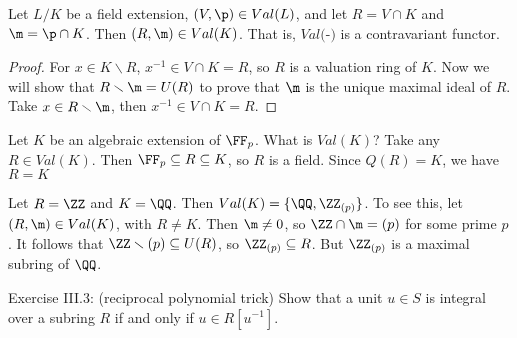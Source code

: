  \begin{proposition}
   Let $L/K$ be a field extension, $(V,\p)\in Val(L)$, and let $R=V\cap K$ and
   $\m=\p\cap K$. Then $(R,\m)\in Val(K)$. That is, $Val($-$)$ is a contravariant functor.
 \end{proposition}
 \begin{proof}
   For $x\in K\smallsetminus R$, $x^{-1}\in V\cap K=R$, so $R$ is a valuation ring of
   $K$. Now we will show that $R\smallsetminus \m = U(R)$ to prove that $\m$ is the
   unique maximal ideal of $R$. Take $x\in R\smallsetminus \m$, then $x^{-1}\in V\cap
   K=R$.
 \end{proof}
 \begin{example}
   Let $K$ be an algebraic extension of $\FF_p$. What is $Val(K)$? Take any $R\in
   Val(K)$. Then $\FF_p\subseteq R \subseteq K$, so $R$ is a field. Since $Q(R)=K$, we
   have $R=K$
 \end{example}
 \begin{example}
   Let $R=\ZZ$ and $K=\QQ$. Then $Val(K)=\{\QQ, \ZZ_{(p)}\}$. To see this, let $(R,\m)\in
   Val(K)$, with $R\neq K$. Then $\m\neq 0$, so $\ZZ\cap \m=(p)$ for some prime $p$. It
   follows that $\ZZ\smallsetminus (p)\subseteq U(R)$, so $\ZZ_{(p)}\subseteq R$. But
   $\ZZ_{(p)}$ is a maximal subring of $\QQ$.
 \end{example}
 
 \setcounter{lecture}{30}

Exercise III.3: (reciprocal polynomial trick) Show that a unit $u\in S$ is integral over
a subring $R$ if and only if $u\in R[u^{-1}]$.

